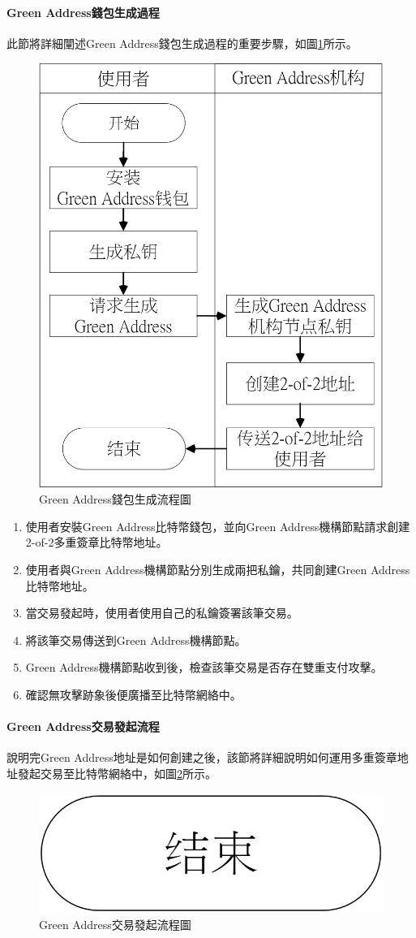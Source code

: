 		 	\paragraph{Green Address錢包生成過程}
		 	此節將詳細闡述Green Address錢包生成過程的重要步驟，如圖\ref{gabuild}所示。
		 	\begin{figure}[h]
				\centering
				\includegraphics[width = .5\textwidth]{gabuild.png}
				\caption{Green Address錢包生成流程圖}\label{gabuild}
			\end{figure}

		 	\begin{enumerate}
		 		\item 使用者安裝Green Address比特幣錢包，並向Green Address機構節點請求創建2-of-2多重簽章比特幣地址。
		 		\item 使用者與Green Address機構節點分別生成兩把私鑰，共同創建Green Address比特幣地址。
		 		\item 當交易發起時，使用者使用自己的私鑰簽署該筆交易。
		 		\item 將該筆交易傳送到Green Address機構節點。
		 		\item Green Address機構節點收到後，檢查該筆交易是否存在雙重支付攻擊。
		 		\item 確認無攻擊跡象後便廣播至比特幣網絡中。
		 	\end{enumerate}

		 	\paragraph{Green Address交易發起流程}
		 	說明完Green Address地址是如何創建之後，該節將詳細說明如何運用多重簽章地址發起交易至比特幣網絡中，如圖\ref{gatx}所示。

		 	\begin{figure}[h]
				\centering
				\includegraphics[width = .7\textwidth]{gatx.png}
				\caption{Green Address交易發起流程圖}\label{gatx}
			\end{figure}

